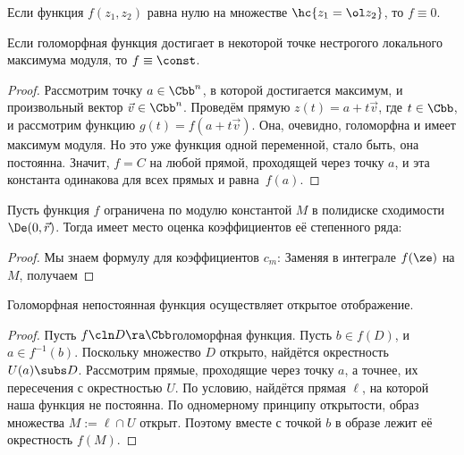 \documentclass[a4paper]{article}
\DeclareMathOperator{\Sk}{Sk}
\begin{document}
\begin{problem}
Если функция $f(z_1,z_2)$ равна нулю на множестве $\hc{z_1 = \ol z_2}$, то $f \equiv 0$.
\end{problem}


\begin{theorem}
Если голоморфная функция достигает в некоторой точке нестрогого локального максимума модуля,
то $f\equiv\const$.
\end{theorem}
\begin{proof}
Рассмотрим точку $a\in \Cbb^n$, в которой достигается максимум, и произвольный вектор
$\vec v\in \Cbb^n$. Проведём прямую $z(t) = a+t\vec v$, где $t\in\Cbb$, и рассмотрим
функцию $g(t)=f(a+t\vec v)$. Она, очевидно, голоморфна и имеет максимум модуля.
Но это уже функция одной переменной, стало быть, она постоянна. Значит, $f=C$
на любой прямой, проходящей через точку $a$, и эта константа одинакова для всех прямых
и равна~$f(a)$.
\end{proof}

\begin{theorem}
Пусть функция $f$ ограничена по модулю константой $M$ в полидиске сходимости $\De(0,\vec r)$.
Тогда имеет место оценка коэффициентов её степенного ряда:
\end{theorem}
\begin{proof}
Мы знаем формулу для коэффициентов $c_m$:
\eqn{c_m = \frac{1}{(2\pi i)^n}\ints{\Sk \De} \frac{f(\ze)\,d\ze}{\prod(\ze_j-a_j)^{m_j+1}}.}
Заменяя в интеграле $f(\ze)$ на $M$, получаем
\hfill\end{proof}

\begin{theorem}
Голоморфная непостоянная функция осуществляет открытое отображение.
\end{theorem}
\begin{proof}
Пусть $f\cln D \ra \Cbb$\т голоморфная функция.
Пусть $b \in f(D)$, и $a \in f^{-1}(b)$. Поскольку множество $D$ открыто, найдётся окрестность $U(a) \subs D$.
Рассмотрим прямые, проходящие через точку $a$, а точнее, их пересечения с окрестностью $U$.
По условию, найдётся прямая $\ell$, на которой наша функция не постоянна. По одномерному принципу открытости,
образ множества $M := \ell \cap U$ открыт. Поэтому вместе с точкой $b$ в образе лежит её окрестность $f(M)$.
\end{proof}
\end{document}
